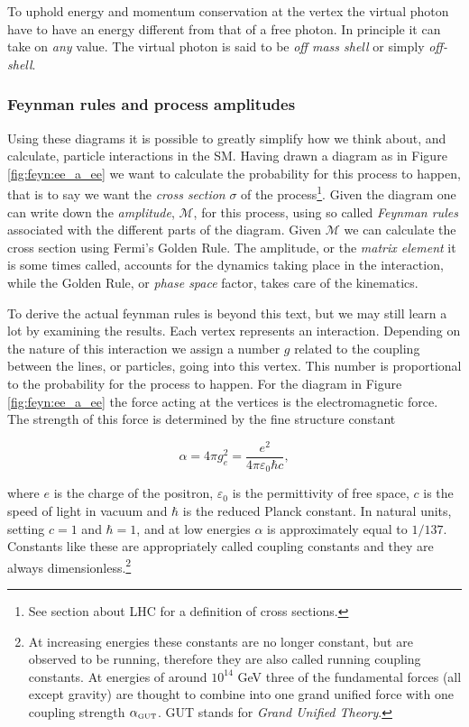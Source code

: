 To uphold energy and momentum conservation at the vertex the virtual photon have to have an energy different from that of a free photon. In principle it can take on \emph{any} value. The virtual photon is said to be \emph{off mass shell} or simply \emph{off-shell}.

\subsubsection{Feynman rules and process amplitudes}
Using these diagrams it is possible to greatly simplify how we think about, and calculate, particle interactions in the SM. Having drawn a diagram as in Figure \ref{fig:feyn:ee_a_ee} we want to calculate the probability for this process to happen, that is to say we want the \emph{cross section} $\sigma$ of the process\footnote{See section about LHC for a definition of cross sections.}. Given the diagram one can write down the \emph{amplitude}, $\mathcal{M}$, for this process, using so called \emph{Feynman rules} associated with the different parts of the diagram. Given $\mathcal{M}$ we can calculate the cross section using Fermi's Golden Rule. The amplitude, or the \emph{matrix element} it is some times called, accounts for the dynamics taking place in the interaction, while the Golden Rule, or \emph{phase space} factor, takes care of the kinematics.

To derive the actual feynman rules is beyond this text, but we may still learn a lot by examining the results. Each vertex represents an interaction. Depending on the nature of this interaction we assign a number $g$ related to the coupling between the lines, or particles, going into this vertex. This number is proportional to the probability for the process to happen. For the diagram in Figure \ref{fig:feyn:ee_a_ee} the force acting at the vertices is the electromagnetic force. The strength of this force is determined by the fine structure constant 

\begin{equation}
	\alpha = 4\pi g_e^2 = \frac{e^2}{4\pi\varepsilon_0\hbar c},
\end{equation}

where $e$ is the charge of the positron, $\varepsilon_0$ is the permittivity of free space, $c$ is the speed of light in vacuum and $\hbar$ is the reduced Planck constant. In natural units, setting $c = 1$ and $\hbar = 1$, and at low energies $\alpha$ is approximately equal to $1/137$. Constants like these are appropriately called coupling constants and they are always dimensionless.\footnote{At increasing energies these constants are no longer constant, but are observed to be running, therefore they are also called running coupling constants. At energies of around $10^{14}$ GeV three of the fundamental forces (all except gravity) are thought to combine into one grand unified force with one coupling strength $\alpha_{\textrm{\tiny{GUT}}}$. GUT stands for \emph{Grand Unified Theory}.}

